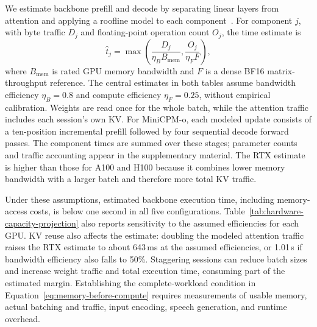 We estimate backbone prefill and decode by separating linear layers from attention and applying a roofline model to each component~\cite{nvidia2023performance}.
For component $j$, with byte traffic $D_j$ and floating-point operation count $O_j$, the time estimate is
\[
  \widehat t_j=\max\left(\frac{D_j}{\eta_B B_{\mathrm{mem}}},\frac{O_j}{\eta_F F}\right),
\]
where $B_{\mathrm{mem}}$ is rated GPU memory bandwidth and $F$ is a dense BF16 matrix-throughput reference.
The central estimates in both tables assume bandwidth efficiency $\eta_B=0.8$ and compute efficiency $\eta_F=0.25$, without empirical calibration.
Weights are read once for the whole batch, while the attention traffic includes each session's own KV.
For MiniCPM-o, each modeled update consists of a ten-position incremental prefill followed by four sequential decode forward passes.
The component times are summed over these stages; parameter counts and traffic accounting appear in the supplementary material.
The RTX estimate is higher than those for A100 and H100 because it combines lower memory bandwidth with a larger batch and therefore more total KV traffic.

Under these assumptions, estimated backbone execution time, including memory-access costs, is below one second in all five configurations.
Table~\ref{tab:hardware-capacity-projection} also reports sensitivity to the assumed efficiencies for each GPU.
KV reuse also affects the estimate: doubling the modeled attention traffic raises the RTX estimate to about 643\,ms at the assumed efficiencies, or 1.01\,s if bandwidth efficiency also falls to 50\%.
Staggering sessions can reduce batch sizes and increase weight traffic and total execution time, consuming part of the estimated margin.
Establishing the complete-workload condition in Equation~\ref{eq:memory-before-compute} requires measurements of usable memory, actual batching and traffic, input encoding, speech generation, and runtime overhead.


